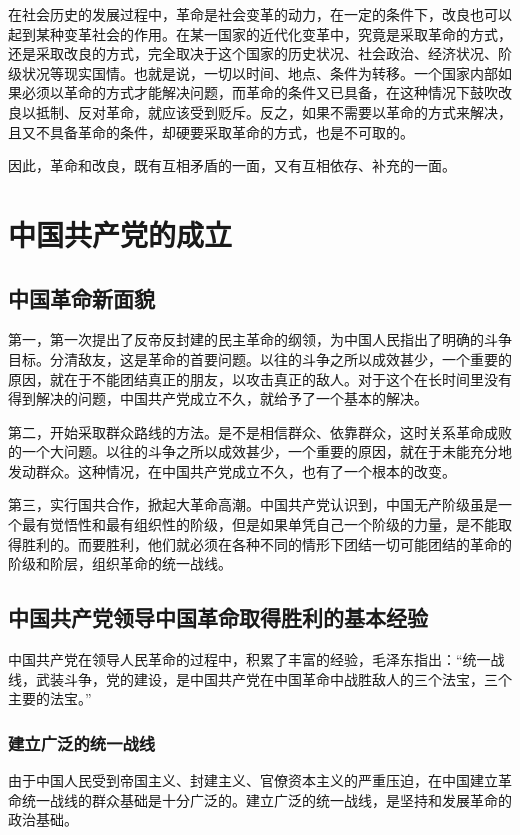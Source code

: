 \documentclass{article}
\begin{document}
\begin{CJK}{UTF8}{song}
在社会历史的发展过程中，革命是社会变革的动力，在一定的条件下，改良也可以起到某种变革社会的作用。在某一国家的近代化变革中，究竟是采取革命的方式，还是采取改良的方式，完全取决于这个国家的历史状况、社会政治、经济状况、阶级状况等现实国情。也就是说，一切以时间、地点、条件为转移。一个国家内部如果必须以革命的方式才能解决问题，而革命的条件又已具备，在这种情况下鼓吹改良以抵制、反对革命，就应该受到贬斥。反之，如果不需要以革命的方式来解决，且又不具备革命的条件，却硬要采取革命的方式，也是不可取的。

因此，革命和改良，既有互相矛盾的一面，又有互相依存、补充的一面。

\section{中国共产党的成立}

\subsection{中国革命新面貌}
第一，第一次提出了反帝反封建的民主革命的纲领，为中国人民指出了明确的斗争目标。分清敌友，这是革命的首要问题。以往的斗争之所以成效甚少，一个重要的原因，就在于不能团结真正的朋友，以攻击真正的敌人。对于这个在长时间里没有得到解决的问题，中国共产党成立不久，就给予了一个基本的解决。

第二，开始采取群众路线的方法。是不是相信群众、依靠群众，这时关系革命成败的一个大问题。以往的斗争之所以成效甚少，一个重要的原因，就在于未能充分地发动群众。这种情况，在中国共产党成立不久，也有了一个根本的改变。

第三，实行国共合作，掀起大革命高潮。中国共产党认识到，中国无产阶级虽是一个最有觉悟性和最有组织性的阶级，但是如果单凭自己一个阶级的力量，是不能取得胜利的。而要胜利，他们就必须在各种不同的情形下团结一切可能团结的革命的阶级和阶层，组织革命的统一战线。
\subsection{中国共产党领导中国革命取得胜利的基本经验}

中国共产党在领导人民革命的过程中，积累了丰富的经验，毛泽东指出：“统一战线，武装斗争，党的建设，是中国共产党在中国革命中战胜敌人的三个法宝，三个主要的法宝。”

\subsubsection{建立广泛的统一战线}
由于中国人民受到帝国主义、封建主义、官僚资本主义的严重压迫，在中国建立革命统一战线的群众基础是十分广泛的。建立广泛的统一战线，是坚持和发展革命的政治基础。

\end{CJK}
\end{document}
